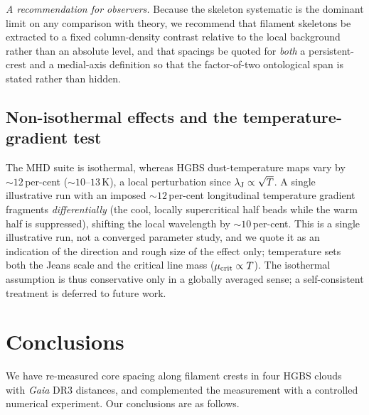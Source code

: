 \documentclass[usenatbib,twoside,twocolumn]{mnras}
\begin{document}
\smallskip\noindent\emph{A recommendation for observers.} Because the skeleton systematic is the dominant limit on any comparison with theory, we recommend that filament skeletons be extracted to a fixed column-density contrast relative to the local background rather than an absolute level, and that spacings be quoted for \emph{both} a persistent-crest and a medial-axis definition so that the factor-of-two ontological span is stated rather than hidden.



\subsection{Non-isothermal effects and the temperature-gradient test}
\label{sec:mt_variation}

The MHD suite is isothermal, whereas HGBS dust-temperature maps vary by $\sim12$\,per-cent ($\sim10$--$13$\,K), a local perturbation since $\lambda_{\rm J}\propto\sqrt{T}$. A single illustrative run with an imposed $\sim12$\,per-cent longitudinal temperature gradient fragments \emph{differentially} (the cool, locally supercritical half beads while the warm half is suppressed), shifting the local wavelength by $\sim10$\,per-cent. This is a single illustrative run, not a converged parameter study, and we quote it as an indication of the direction and rough size of the effect only; temperature sets both the Jeans scale and the critical line mass ($\mu_{\rm crit}\propto T$). The isothermal assumption is thus conservative only in a globally averaged sense; a self-consistent treatment is deferred to future work.

\section{Conclusions}

We have re-measured core spacing along filament crests in four HGBS clouds with \textit{Gaia} DR3 distances, and complemented the measurement with a controlled numerical experiment. Our conclusions are as follows.
\end{document}
